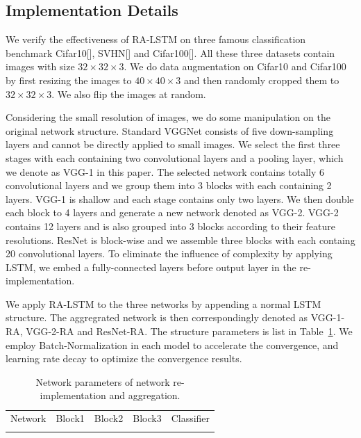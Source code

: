 \documentclass[runningheads]{llncs}
\begin{document}
\subsection{Implementation Details}

We verify the effectiveness of RA-LSTM on three famous classification benchmark Cifar10[], SVHN[] and Cifar100[]. All these three datasets contain images with size $32\times 32\times 3$. We do data augmentation on Cifar10 and Cifar100 by first resizing the images to $40\times 40\times 3$ and then randomly cropped them to $32\times 32\times 3$. We also flip the images at random.

Considering the small resolution of images, we do some manipulation on the original network structure. Standard VGGNet consists of five down-sampling layers and cannot be directly applied to small images. We select the first three stages with each containing two convolutional layers and a pooling layer, which we denote as VGG-1 in this paper. The selected network contains totally 6 convolutional layers and we group them into 3 blocks with each containing 2 layers. VGG-1 is shallow and each stage contains only two layers. We then double each block to 4 layers and generate a new network denoted as VGG-2. VGG-2 contains 12 layers and is also grouped into 3 blocks according to their feature resolutions. ResNet is block-wise and we assemble three blocks with each containg 20 convolutional layers. To eliminate the influence of complexity by applying LSTM, we embed a fully-connected layers before output layer in the re-implementation.

We apply RA-LSTM to the three networks by appending a normal LSTM structure. The aggregrated network is then correspondingly denoted as VGG-1-RA, VGG-2-RA and ResNet-RA. The structure parameters is list in Table~\ref{table:struc}. We employ Batch-Normalization in each model to accelerate the convergence, and learning rate decay to optimize the convergence results.

\setlength{\tabcolsep}{4pt}
\begin{table}
\begin{center}
\caption{
Network parameters of network re-implementation and aggregation.
}
\label{table:struc}
\begin{tabular}{lllll}
\hline\noalign{\smallskip}
Network& Block1 & Block2 & Block3 & Classifier\\
\noalign{\smallskip}
\hline
\noalign{\smallskip}
\hline
\end{tabular}
\end{center}
\end{table}
\setlength{\tabcolsep}{1.4pt}
\end{document}
